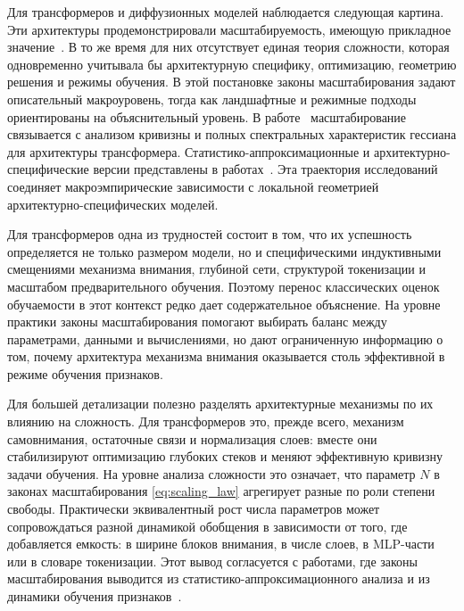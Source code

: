 Для трансформеров и диффузионных моделей наблюдается следующая картина.
Эти архитектуры продемонстрировали масштабируемость, имеющую прикладное значение~\cite{vaswani2017attention,ho2020denoising}.
В то же время для них отсутствует единая теория сложности, которая одновременно учитывала бы архитектурную специфику, оптимизацию, геометрию решения и режимы обучения.
В этой постановке законы масштабирования задают описательный макроуровень, тогда как ландшафтные и режимные подходы ориентированы на объяснительный уровень.
В работе~\cite{petrov2025curvaturegap} масштабирование связывается с анализом кривизны и полных спектральных характеристик гессиана для архитектуры трансформера. Статистико-аппроксимационные и архитектурно-специфические версии представлены в работах~\cite{transformerScalingLowDim2024,transformerScalingStatApprox2022,moeScalingLaws2026}.
Эта траектория исследований соединяет макроэмпирические зависимости с локальной геометрией архитектурно-специфических моделей.

Для трансформеров одна из трудностей состоит в том, что их успешность определяется не только размером модели, но и специфическими индуктивными смещениями механизма внимания, глубиной сети, структурой токенизации и масштабом предварительного обучения.
Поэтому перенос классических оценок обучаемости в этот контекст редко дает содержательное объяснение.
На уровне практики законы масштабирования помогают выбирать баланс между параметрами, данными и вычислениями, но дают ограниченную информацию о том, почему архитектура механизма внимания оказывается столь эффективной в режиме обучения признаков.

Для большей детализации полезно разделять архитектурные механизмы по их влиянию на сложность. Для трансформеров это, прежде всего, механизм самовнимания, остаточные связи и нормализация слоев: вместе они стабилизируют оптимизацию глубоких стеков и меняют эффективную кривизну задачи обучения. На уровне анализа сложности это означает, что параметр $N$ в законах масштабирования \eqref{eq:scaling_law} агрегирует разные по роли степени свободы. Практически эквивалентный рост числа параметров может сопровождаться разной динамикой обобщения в зависимости от того, где добавляется емкость: в ширине блоков внимания, в числе слоев, в MLP-части или в словаре токенизации.
Этот вывод согласуется с работами, где законы масштабирования выводится из статистико-аппроксимационного анализа и из динамики обучения признаков~\cite{transformerScalingLowDim2024,transformerScalingStatApprox2022,featureDynamicsScaling2025}.

